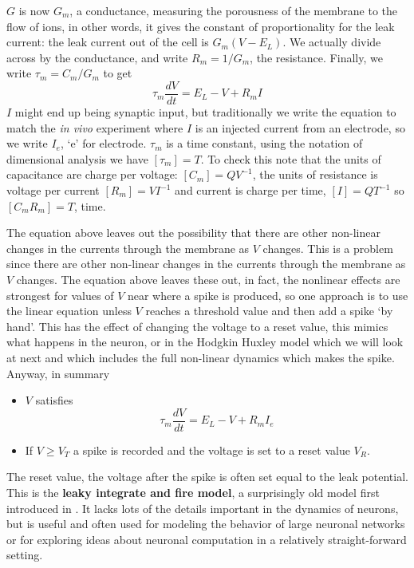 \documentclass[12pt]{article}
\begin{document}
$G$ is now $G_m$, a conductance, measuring the porousness of the
membrane to the flow of ions, in other words, it gives the constant of proportionality for the leak current: the leak current out of the cell is
$G_m(V-E_L)$. We actually divide across by the conductance, and write
$R_m=1/G_m$, the resistance. Finally, we write $\tau_m=C_m/G_m$ to get
\begin{equation}
\tau_m\frac{dV}{dt}=E_L-V+R_mI
\end{equation}
$I$ might end up being synaptic input, but traditionally we write the
equation to match the \textsl{in vivo} experiment where $I$ is an
injected current from an electrode, so we write $I_e$, \lq{}e\rq{} for
electrode. $\tau_m$ is a time constant, using the notation of
dimensional analysis we have $[\tau_m]=T$. To check this note that the
units of capacitance are charge per voltage: $[C_m]=QV^{-1}$, the
units of resistance is voltage per current $[R_m]=VI^{-1}$ and current
is charge per time, $[I]=QT^{-1}$ so $[C_mR_m]=T$, time.

The equation above leaves out the possibility that there are other
non-linear changes in the currents through the membrane as $V$
changes. This is a problem since there are other non-linear changes in
the currents through the membrane as $V$ changes. The equation above
leaves these out, in fact, the nonlinear effects are strongest for
values of $V$ near where a spike is produced, so one approach is to
use the linear equation unless $V$ reaches a threshold value and then
add a spike \lq{}by hand\rq{}. This has the effect of changing the
voltage to a reset value, this mimics what happens in the neuron, or
in the Hodgkin Huxley model which we will look at next and which
includes the full non-linear dynamics which makes the spike. Anyway,
in summary
\begin{itemize}
\item $V$ satisfies
\begin{equation}
\tau_m\frac{dV}{dt}=E_L-V+R_mI_e
\end{equation}
\item If $V\ge V_T$ a spike is recorded and the voltage is set to a
  reset value $V_R$.
\end{itemize}
The reset value, the voltage after the spike is often set equal to the
 leak potential. This is the \textbf{leaky integrate and fire model}, a surprisingly
old model first introduced in \cite{Lapicque1907a}. It lacks lots of
the details important in the dynamics of neurons, but is useful and
often used for modeling the behavior of large neuronal networks or for
exploring ideas about neuronal computation in a relatively
straight-forward setting.
\end{document}
